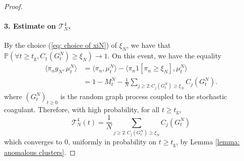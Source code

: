 \begin{proof}
       \paragraph{3. Estimate on $\mathcal{T}^4_N$.} By the choice (\ref{eq: choice of xiN}) of $\xi_N$, we have that $\mathbb{P}(\forall  t\geq t_\mathrm{g}, C_1(G^N_t)\geq \xi_N)\rightarrow 1.$ On this event, we have the equality \begin{equation}
           \begin{split}
               \langle \pi_n g_N, \mu^N_t\rangle &=\langle \pi_n, \mu^N_t\rangle - \langle \pi_n 1[\pi_n\geq \xi_N], \mu^N_t\rangle  \\[2ex] & = 1-M^N_t-\frac{1}{N}\sum_{j\ge 2:C_j(G^N_t)\ge \xi_N} C_j(G^N_t). 
           \end{split} 
       \end{equation} where $(G^N_t)_{t\geq 0}$ is the random graph process coupled to the stochastic coagulant. Therefore, with high probability, for all $t\ge t_\mathrm{g}$, \begin{equation} \mathcal{T}^4_N(t) = \frac{1}{N}\sum_{j\ge 2:C_j(G^N_t)\ge \xi_N} C_j(G^N_t) \end{equation} which converges to $0$, uniformly in probability on $t\geq t_\mathrm{g}$, by Lemma \ref{lemma: anomalous clusters}.

\end{proof}
